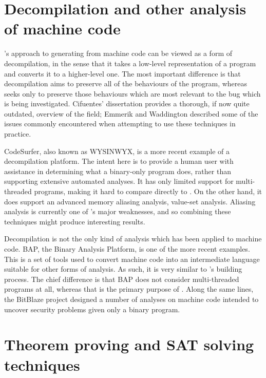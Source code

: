 \section{Decompilation and other analysis of machine code}

{\Technique}'s approach to generating {\StateMachines} from machine
code can be viewed as a form of decompilation, in the sense that it
takes a low-level representation of a program and converts it to a
higher-level one.  The most important difference is that decompilation
aims to preserve all of the behaviours of the program, whereas
{\technique} seeks only to preserve those behaviours which are most
relevant to the bug which is being investigated.  Cifuentes'
dissertation\cite{Cifuentes1994} provides a thorough, if now quite
outdated, overview of the field; Emmerik and
Waddington\cite{Emmerik2004} described some of the issues commonly
encountered when attempting to use these techniques in practice.

CodeSurfer\cite{Balakrishnan2005a,Balakrishnan2008}, also known as
WYSINWYX, is a more recent example of a decompilation platform.  The
intent here is to provide a human user with assistance in determining
what a binary-only program does, rather than supporting extensive
automated analyses.  It has only limited support for multi-threaded
programs, making it hard to compare directly to {\technique}.  On the
other hand, it does support an advanced memory aliasing analysis,
value-set analysis\cite{Balakrishnan2004}.  Aliasing analysis is
currently one of {\technique}'s major weaknesses, and so combining
these techniques might produce interesting results.

Decompilation is not the only kind of analysis which has been applied
to machine code.  BAP, the Binary Analysis Platform\cite{Brumley2011},
is one of the more recent examples.  This is a set of tools used to
convert machine code into an intermediate language suitable for other
forms of analysis.  As such, it is very similar to {\technique}'s
{\StateMachine} building process.  The chief difference is that BAP
does not consider multi-threaded programs at all, whereas that is the
primary purpose of {\technique}.  Along the same lines, the
BitBlaze\cite{Song2008} project designed a number of analyses on
machine code intended to uncover security problems given only a binary
program.  

\section{Theorem proving and SAT solving techniques}

